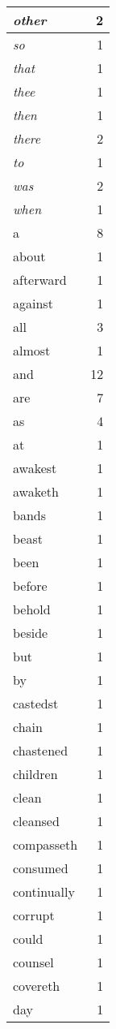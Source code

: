 \begin{center}
\begin{longtable}{l|r}
\emph{other} & 2 \\ \hline
\emph{so} & 1 \\ \hline
\emph{that} & 1 \\ \hline
\emph{thee} & 1 \\ \hline
\emph{then} & 1 \\ \hline
\emph{there} & 2 \\ \hline
\emph{to} & 1 \\ \hline
\emph{was} & 2 \\ \hline
\emph{when} & 1 \\ \hline
a & 8 \\ \hline
about & 1 \\ \hline
afterward & 1 \\ \hline
against & 1 \\ \hline
all & 3 \\ \hline
almost & 1 \\ \hline
and & 12 \\ \hline
are & 7 \\ \hline
as & 4 \\ \hline
at & 1 \\ \hline
awakest & 1 \\ \hline
awaketh & 1 \\ \hline
bands & 1 \\ \hline
beast & 1 \\ \hline
been & 1 \\ \hline
before & 1 \\ \hline
behold & 1 \\ \hline
beside & 1 \\ \hline
but & 1 \\ \hline
by & 1 \\ \hline
castedst & 1 \\ \hline
chain & 1 \\ \hline
chastened & 1 \\ \hline
children & 1 \\ \hline
clean & 1 \\ \hline
cleansed & 1 \\ \hline
compasseth & 1 \\ \hline
consumed & 1 \\ \hline
continually & 1 \\ \hline
corrupt & 1 \\ \hline
could & 1 \\ \hline
counsel & 1 \\ \hline
covereth & 1 \\ \hline
day & 1 \\ \hline

\end{longtable}
\end{center}
